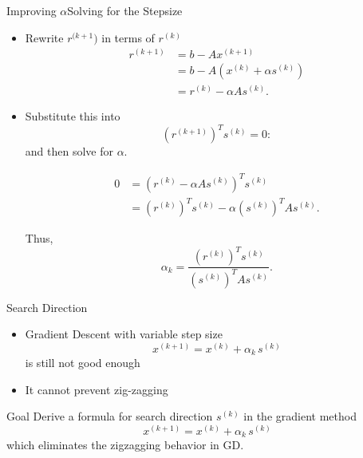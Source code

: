 \documentclass[10pt]{beamer}
\begin{document}
\begin{frame}{Improving $\alpha$}{Solving for the Stepsize}

\begin{itemize}
    \item[7.] Rewrite $r^{(k+1})$ in terms of $r^{(k)}$
\begin{align*}
r^{(k+1)}
&= b-Ax^{(k+1)} \\
&= b-A\left(x^{(k)}+\alpha s^{(k)}\right) \\
&= r^{(k)}-\alpha As^{(k)}.
\end{align*}

\item[8.] Substitute this into
\[
(r^{(k+1)})^Ts^{(k)}=0:
\]
and then solve for $\alpha$.

\begin{align*}
0
&=
\left(r^{(k)}-\alpha As^{(k)}\right)^Ts^{(k)} \\[1mm]
&=
(r^{(k)})^Ts^{(k)}
-\alpha(s^{(k)})^TAs^{(k)}.
\end{align*}

Thus,
\[
\boxed{
\alpha_k
=
\frac{(r^{(k)})^Ts^{(k)}}
     {(s^{(k)})^TAs^{(k)}}
}.
\]
\end{itemize}

\end{frame}
\begin{frame}{Search Direction}
\begin{itemize}
    \item Gradient Descent with variable step size
    $$
    x^{(k+1)} = x^{(k)} + \alpha_k \, s^{(k)}
    $$
    is still not good enough 
    \vfill 
    \item It cannot prevent zig-zagging 
    \vfill
\end{itemize}

\begin{block}{Goal}
Derive a formula for search direction $s^{(k)}$ in the gradient method 
    \[
    x^{(k+1)} = x^{(k)} + \alpha_k \, s^{(k)}
    \]
which eliminates the zigzagging behavior in GD. 
\end{block}
\end{frame}
\end{document}

